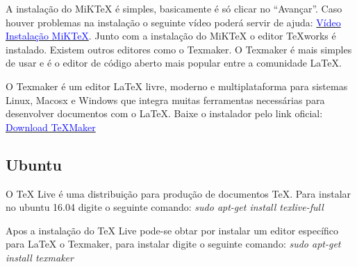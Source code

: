 A instalação do MiKTeX é simples, basicamente é só clicar no “Avançar”. Caso houver problemas na instalação o seguinte vídeo poderá servir de ajuda: \href{https://www.youtube.com/watch?v=4udFXbqtayE&list=LLQVoeslEpxQJ0UavpXUEkq}{\textcolor{blue}{Vídeo Instalação MiKTeX}}. Junto com a instalação do MiKTeX o editor TeXworks é instalado. Existem outros editores como o Texmaker. O Texmaker é mais simples de usar e é o editor de código aberto mais popular entre a comunidade LaTeX.

O Texmaker é um editor LaTeX livre, moderno e multiplataforma para sistemas Linux, Macosx e Windows que integra muitas ferramentas necessárias para desenvolver documentos com o LaTeX. Baixe o instalador pelo link oficial: \href{http://www.xm1math.net/texmaker/download.html}{\textcolor{blue}{Download TeXMaker}}

\subsection{Ubuntu}

O TeX Live é uma distribuição para produção de documentos \TeX \xspace. Para instalar no ubuntu 16.04 digite o seguinte comando: \emph{sudo apt-get install texlive-full}

Apos a instalação do TeX Live pode-se obtar por instalar um editor específico para LaTeX o Texmaker, para instalar digite o seguinte comando: \emph{sudo apt-get install texmaker}